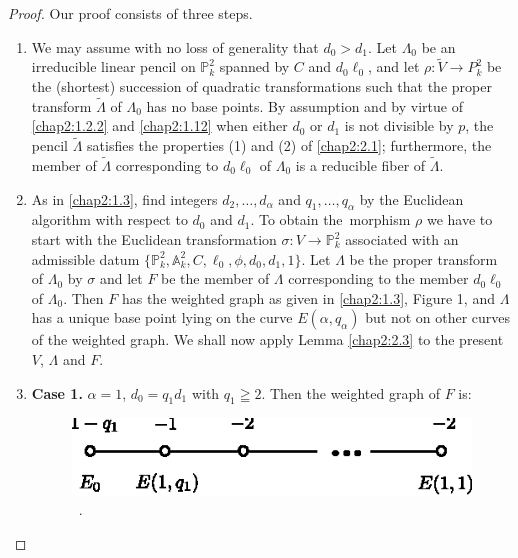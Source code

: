 \begin{proof}
Our proof consists of three steps.
\begin{enumerate}
\renewcommand{\theenumi}{\Roman{enumi}}
\renewcommand{\labelenumi}{\rm(\theenumi)}
\item We may assume with no loss of generality that $d_{0}>d_{1}$. Let
  $\Lambda_{0}$ be an irreducible linear pencil on
  $\mathbb{P}^{2}_{k}$ spanned by $C$ and $d_{0}\ell_{0}$, and let
  $\rho:\widetilde{V}\to P^{2}_{k}$ be the (shortest) succession of
  quadratic transformations such that the proper transform
  $\widetilde{\Lambda}$ of $\Lambda_{0}$ has no base points. By
  assumption and by virtue of \ref{chap2:1.2.2} and \ref{chap2:1.12} when either
  $d_{0}$ or $d_{1}$ is not divisible by $p$, the pencil
  $\widetilde{\Lambda}$ satisfies the properties (1) and (2) of
  \ref{chap2:2.1}; furthermore, the member of $\widetilde{\Lambda}$
  corresponding to $d_{0}\ell_{0}$ of $\Lambda_{0}$ is a reducible
  fiber of $\widetilde{\Lambda}$.

\item As in \ref{chap2:1.3}, find integers $d_{2},\ldots,d_{\alpha}$ and
  $q_{1},\ldots,q_{\alpha}$ by the Euclidean algorithm with respect to
  $d_{0}$ and $d_{1}$. To obtain the\pageoriginale\ morphism $\rho$ we
  have to start with the Euclidean transformation $\sigma:V\to
  \mathbb{P}^{2}_{k}$ associated with an admissible datum
  $\{\mathbb{P}^{2}_{k},\mathbb{A}^{2}_{k},
  C,\ell_{0},\phi,d_{0},d_{1},1\}$. Let $\Lambda$ be the proper
  transform of $\Lambda_{0}$ by $\sigma$ and let $F$ be the member of
  $\Lambda$ corresponding to the member $d_{0}\ell_{0}$ of
  $\Lambda_{0}$. Then $F$ has the weighted graph as given in
  \ref{chap2:1.3}, Figure 1, and $\Lambda$ has a unique base point lying on
  the curve $E(\alpha,q_{\alpha})$ but not on other curves of the
  weighted graph. We shall now apply Lemma \ref{chap2:2.3} to the present
  $V$, $\Lambda$ and $F$.

\item {\bf Case 1.} $\alpha=1$, \iec $d_{0}=q_{1}d_{1}$ with
  $q_{1}\geqq 2$. Then the weighted graph of $F$ is:
\begin{figure}[H]
\centering
\includegraphics{figures/chap2-fig4.eps} \ .
\end{figure}


\end{enumerate}
\end{proof}
